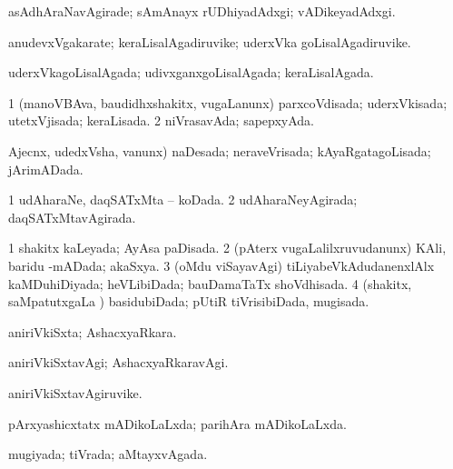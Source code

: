 \bentry
{} 
\gl{\kirxvi}
\expl{}
\bmng
 asAdhAraNavAgirade; sAmAnayx rUDhiyadAdxgi; vADikeyadAdxgi. 
\emng
\eentry

\bentry
{} 
\gl{\nA}
\expl{}
\bmng
 anudevxVgakarate; keraLisalAgadiruvike; uderxVka goLisalAgadiruvike. 
\emng
\eentry

\bentry
{} 
\gl{\gu}
\expl{}
\bmng
 uderxVkagoLisalAgada; udivxganxgoLisalAgada; keraLisalAgada. 
\emng
\eentry

\bentry
{} 
\gl{\gu}
\expl{}
\bmng
\bnum
\num{1} (manoVBAva, baudidhxshakitx, \mo vugaLanunx) parxcoVdisada; uderxVkisada; utetxVjisada; keraLisada. 
\num{2} niVrasavAda; sapepxyAda. 
\enum
\emng
\eentry

\bentry
{} 
\gl{\gu}
\expl{}
\bmng
 \eng{(} Ajecnx, udedxVsha, \mo vanunx) naDesada; neraveVrisada; kAyaRgatagoLisada; jArimADada. 
\emng
\eentry

\bentry
{} 
\gl{\gu}
\expl{}
\bmng
\bnum
\num{1} udAharaNe, daqSATxMta -- koDada. 
\num{2} udAharaNeyAgirada; daqSATxMtavAgirada. 
\enum
\emng
\eentry

\bentry
{} 
\gl{\gu}
\expl{}
\bmng
\bnum
\num{1} shakitx kaLeyada; AyAsa paDisada. 
\num{2} (pAterx \mo vugaLalilxruvudanunx) KAli, baridu -mADada; akaSxya. 
\num{3} (oMdu viSayavAgi) tiLiyabeVkAdudanenxlAlx kaMDuhiDiyada; heVLibiDada; bauDamaTaTx shoVdhisada. 
\num{4} (shakitx, saMpatutxgaLa \vi) basidubiDada; pUtiR tiVrisibiDada, mugisada. 
\enum
\emng
\eentry

\bentry
{} 
\gl{\gu}
\expl{}
\bmng
 aniriVkiSxta; AshacxyaRkara. 
\emng
\eentry

\bentry
{} 
\gl{\kirxvi}
\expl{}
\bmng
 aniriVkiSxtavAgi; AshacxyaRkaravAgi. 
\emng
\eentry

\bentry
{} 
\gl{\nA}
\expl{}
\bmng
 aniriVkiSxtavAgiruvike. 
\emng
\eentry

\bentry
{} 
\gl{\gu}
\expl{}
\bmng
 pArxyashicxtatx mADikoLaLxda; parihAra mADikoLaLxda. 
\emng
\eentry

\bentry
{} 
\gl{\gu}
\expl{}
\bmng
 mugiyada; tiVrada; aMtayxvAgada. 
\emng
\eentry

